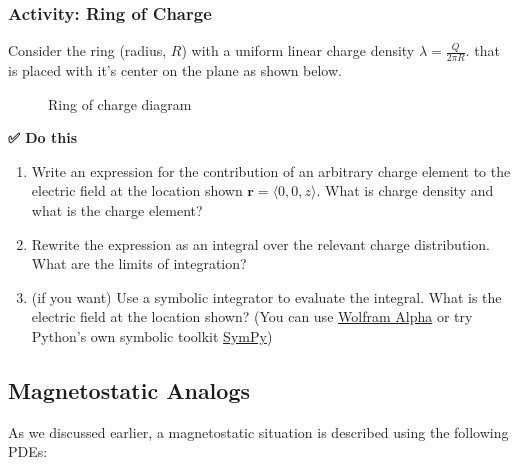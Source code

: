 \subsubsection{Activity: Ring of Charge}\label{activity-ring-of-charge}

Consider the ring (radius, \(R\)) with a uniform linear charge density
\(\lambda = \frac{Q}{2\pi R}\). that is placed with it's center on the
plane as shown below.

\begin{figure}
\centering
{}
\caption{Ring of charge diagram}
\end{figure}

\textbf{✅ Do this}

\begin{enumerate}
\def\labelenumi{\arabic{enumi}.}
\tightlist
\item
  Write an expression for the contribution of an arbitrary charge
  element to the electric field at the location shown
  \(\mathbf{r} = \langle 0,0,z \rangle\). What is charge density and
  what is the charge element?
\item
  Rewrite the expression as an integral over the relevant charge
  distribution. What are the limits of integration?
\item
  (if you want) Use a symbolic integrator to evaluate the integral. What
  is the electric field at the location shown? (You can use
  \href{https://www.wolframalpha.com/}{Wolfram Alpha} or try Python's
  own symbolic toolkit
  \href{https://www.sympy.org/en/index.html}{SymPy})
\end{enumerate}

\begin{Shaded}
\begin{Highlighting}[]
\end{Highlighting}
\end{Shaded}

\subsection{Magnetostatic Analogs}\label{magnetostatic-analogs}

As we discussed earlier, a magnetostatic situation is described using
the following PDEs:

